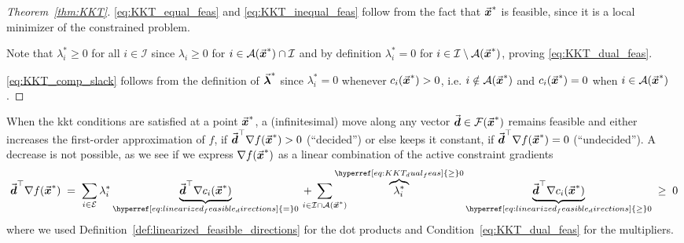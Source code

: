 \begin{proof}[Theorem~\ref{thm:KKT}]
  \eqref{eq:KKT_equal_feas} and \eqref{eq:KKT_inequal_feas} follow from the fact that \(\vec{\boldsymbol{x}}^{\ast}\) is feasible, since it is a local minimizer of the constrained problem.
  
  Note that \(\lambda_{i}^{\ast} \ge 0\) for all \(i\in\mathcal{I}\) since \(\lambda_{i} \ge 0\) for \(i\in\mathcal{A}(\vec{\boldsymbol{x}}^{\ast}) \cap \mathcal{I}\) and by definition \(\lambda_{i}^{\ast} = 0\) for \(i\in\mathcal{I} \setminus \mathcal{A}(\vec{\boldsymbol{x}}^{\ast})\), proving \eqref{eq:KKT_dual_feas}.

  \eqref{eq:KKT_comp_slack} follows from the definition of \(\vec{\boldsymbol{\lambda}}^{\ast}\) since \(\lambda_{i}^{\ast} = 0\) whenever \(c_{i}(\vec{\boldsymbol{x}}^{\ast}) > 0\), i.e. \(i \notin \mathcal{A}(\vec{\boldsymbol{x}}^{\ast})\) and \(c_{i}(\vec{\boldsymbol{x}}^{\ast}) = 0\) when \(i \in \mathcal{A}(\vec{\boldsymbol{x}}^{\ast})\).
\end{proof}


When the \gls{kkt} conditions are satisfied at a point \(\vec{\boldsymbol{x}}^{\ast}\), a (infinitesimal) move along any vector \(\vec{\boldsymbol{d}} \in \mathcal{F}(\vec{\boldsymbol{x}}^{\ast})\) remains feasible and either increases the first-order approximation of \(f\), if \(\vec{\boldsymbol{d}}^\top \nabla f(\vec{\boldsymbol{x}}^{\ast}) > 0\) (``decided'') or else keeps it constant, if \(\vec{\boldsymbol{d}}^\top \nabla f(\vec{\boldsymbol{x}}^{\ast}) = 0\) (``undecided'').
A decrease is not possible, as we see if we express \(\nabla f(\vec{\boldsymbol{x}}^{\ast})\) as a linear combination of the active constraint gradients
\newcommand{\linkeq}[1]{\mathrel{\hyperref[#1]{=}}}   %
\newcommand{\linkge}[1]{\mathrel{\hyperref[#1]{\ge}}} %
\begin{equation}\label{eq:KKT_objective_gradient}
\vect{d}^{\top}\nabla f(\vect{x}^{\ast})
\;=\;
\sum_{i\in\mathcal{E}}
\lambda_i^{\ast}
\underbrace{\vect{d}^{\top}\nabla c_i(\vect{x}^{\ast})}_{\linkeq{eq:linearized_feasible_directions}0}
\;+\;
\sum_{\mathclap{i\in\mathcal{I}\cap\mathcal{A}(\vect{x}^{\ast})}}
\overbrace{\lambda_i^{\ast}}^{\linkge{eq:KKT_dual_feas}0}
\underbrace{\vect{d}^{\top}\nabla c_i(\vect{x}^{\ast})}_{\linkge{eq:linearized_feasible_directions}0}
\;\ge\;
0
\end{equation}
where we used Definition~\ref{def:linearized_feasible_directions} for the dot products and Condition~\eqref{eq:KKT_dual_feas} for the multipliers.






